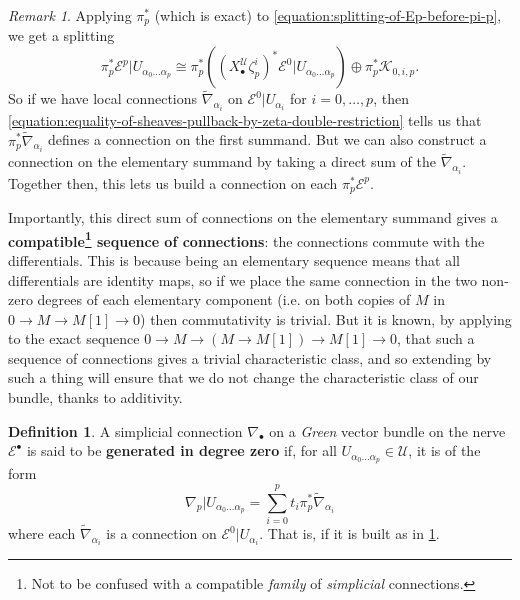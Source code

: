 \documentclass[11pt,fleqn]{article}
\theoremstyle{plain}
\theoremstyle{definition}
\newtheorem{definition}[theorem]{Definition}
\theoremstyle{remark}
\newtheorem{remark}[theorem]{Remark}
\numberwithin{equation}{theorem}
\newcommand{\cover}{\mathcal{U}}
\newcommand{\restricted}{\mathbin{\big\vert}}
\newcommand{\define}[1]{\textbf{#1}}
\newcommand{\nerve}[1]{X_{#1}^\cover}
\begin{document}
        \begin{remark}\label{remark:explaining-compatible-extension-of-connection}
            Applying $\pi_p^*$ (which is exact) to \cref{equation:splitting-of-Ep-before-pi-p}, we get a splitting
            \begin{equation}
            \label{equation:that-splitting-of-Ep}
                \pi_p^* \mathcal{E}^p \restricted U_{\alpha_0\ldots\alpha_p}
                \cong
                \pi_p^* \left( \left(\nerve{\bullet}\zeta_p^i\right)^* \mathcal{E}^0 \restricted U_{\alpha_0\ldots\alpha_p}\right)
                \oplus
                \pi_p^* \mathcal{K}_{0,i,p}.
            \end{equation}
            So if we have local connections $\widetilde{\nabla}_{\alpha_i}$ on $\mathcal{E}^0\restricted U_{\alpha_i}$ for $i=0,\ldots,p$, then \cref{equation:equality-of-sheaves-pullback-by-zeta-double-restriction} tells us that $\pi_p^*\widetilde{\nabla}_{\alpha_i}$ defines a connection on the first summand.
            But we can also construct a connection on  the elementary summand by taking a direct sum of the $\widetilde{\nabla}_{\alpha_i}$.
            Together then, this lets us build a connection on each $\pi_p^*\mathcal{E}^p$.

            Importantly, this direct sum of connections on the elementary summand gives a \define{compatible\footnote{Not to be confused with a compatible \emph{family} of \emph{simplicial} connections.} sequence of connections}: the connections commute with the differentials.
            This is because being an elementary sequence means that all differentials are identity maps, so if we place the same connection in the two non-zero degrees of each elementary component (i.e. on both copies of $M$ in $0\to M\to M[1]\to 0$) then commutativity is trivial.
            But it is known, by applying \cite[Lemma~4.22]{Baum&Bott1972} to the exact sequence $0\to M \to (M\to M[1])\to M[1]\to0$, that such a sequence of connections gives a trivial characteristic class, and so extending by such a thing will ensure that we do not change the characteristic class of our bundle, thanks to additivity.
        \end{remark}

        \begin{definition}\label{definition:generated-in-degree-zero}
            A simplicial connection $\nabla_\bullet$ on a \emph{Gre{}en} vector bundle on the nerve $\mathcal{E}^\bullet$ is said to be \define{generated in degree zero} if, for all $U_{\alpha_0\ldots\alpha_p}\in\cover$, it is of the form
            \[
                \nabla_p\restricted U_{\alpha_0\ldots\alpha_p}
                = \sum_{i=0}^p t_i \pi_p^*\widetilde{\nabla}_{\alpha_i}
            \]
            where each $\widetilde{\nabla}_{\alpha_i}$ is a connection on $\mathcal{E}^0\restricted U_{\alpha_i}$.
            That is, if it is built as in \cref{remark:explaining-compatible-extension-of-connection}.
        \end{definition}
\end{document}
